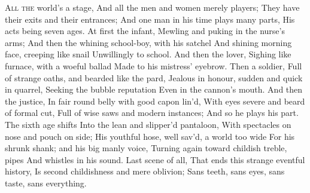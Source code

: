 \documentclass[fontsize=9, a5paper]{scrbook}
\newcommand\blankpage{%
    \null
    \thispagestyle{empty}%
    \addtocounter{page}{-1}%
    \newpage}
\begin{document}
\afterpage{\blankpage}
\begin{poem}
	\begin{stanza}
		\verseindent\verseindent\verseindent\textsc{All the} world’s a stage,\verseline
		And all the men and women merely players;\verseline
		They have their exits and their entrances;\verseline
		And one man in his time plays many parts,\verseline
		His acts being seven ages. At first the infant,\verseline
		Mewling and puking in the nurse’s arms;\verseline
		And then the whining school-boy, with his satchel\verseline
		And shining morning face, creeping like snail\verseline
		Unwillingly to school. And then the lover,\verseline
		Sighing like furnace, with a woeful ballad\verseline
		Made to his mistress’ eyebrow. Then a soldier,\verseline
		Full of strange oaths, and bearded like the pard,\verseline
		Jealous in honour, sudden and quick in quarrel,\verseline
		Seeking the bubble reputation\verseline
		Even in the cannon’s mouth. And then the justice,\verseline
		In fair round belly with good capon lin’d,\verseline
		With eyes severe and beard of formal cut,\verseline
		Full of wise saws and modern instances;\verseline
		And so he plays his part. The sixth age shifts\verseline
		Into the lean and slipper’d pantaloon,\verseline
		With spectacles on nose and pouch on side;\verseline
		His youthful hose, well sav’d, a world too wide\verseline
		For his shrunk shank; and his big manly voice,\verseline
		Turning again toward childish treble, pipes\verseline
		And whistles in his sound. Last scene of all,\verseline
		That ends this strange eventful history,\verseline
		Is second childishness and mere oblivion;\verseline
		Sans teeth, sans eyes, sans taste, sans everything.
	\end{stanza}
\end{poem}

\pagebreak
\end{document}
